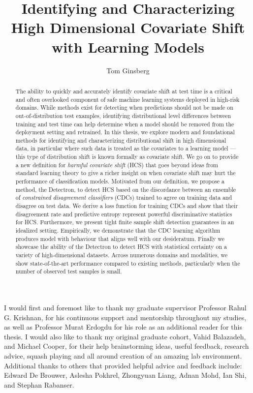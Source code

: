 \documentclass{ut-thesis}
\author{Tom Ginsberg}
\title{Identifying and Characterizing High Dimensional Covariate Shift with Learning Models}
\begin{document}
    \maketitle
    \begin{abstract}
        The ability to quickly and accurately identify covariate shift at test time is a critical and often overlooked component of safe machine learning systems deployed in high-risk domains.
        While methods exist for detecting when predictions should not be made on out-of-distribution test examples, identifying distributional level differences between training and test time can help determine when a model should be removed from the deployment setting and retrained.
        In this thesis, we explore modern and foundational methods for identifying and characterizing distributional shift in high dimensional data, in particular where such data is treated as the covariates to a learning model --- this type of distribution shift is known formally as covariate shift.
        We go on to provide a new definition for \textit{harmful covariate shift} ({\small HCS}) that goes beyond ideas from standard learning theory to give a richer insight on when covariate shift may hurt the performance of classification models.
        Motivated from our definition, we propose a method, the Detectron, to detect {\small HCS} based on the discordance between an ensemble of \textit{constrained disagreement classifiers} (CDCs)  trained to agree on training data and disagree on test data.
        We derive a loss function for training CDCs and show that their disagreement rate and predictive entropy represent powerful discriminative statistics for {\small HCS}.
        Furthermore, we present tight finite sample shift detection guarantees in an idealized setting.
        Empirically, we demonstrate that the CDC learning algorithm produces model with behaviour that aligns well with our desideratum.
        Finally we showcase the ability of the Detectron to detect {\small HCS} with statistical certainty on a variety of high-dimensional datasets.
        Across numerous domains and modalities, we show state-of-the-art performance compared to existing methods, particularly when the number of observed test samples is small.
    \end{abstract}

    \begin{acknowledgements}
        I would first and foremost like to thank my graduate supervisor Professor Rahul G. Krishnan,
        for his continuous support and mentorship throughout my studies, as well as Professor Murat Erdogdu for
        his role as an additional reader for this thesis.
        I would also like to thank my original graduate cohort, Vahid Balazadeh, and Michael Cooper, for their
        help brainstorming ideas, useful feedback, research advice, squash playing and all
        around creation of an amazing lab environment.
        Additional thanks to others that provided helpful advice and feedback include:
        Edward De Brouwer, Aslesha Pokhrel, Zhongyuan Liang, Adnan Mohd, Ian Shi, and Stephan Rabanser.
    \end{acknowledgements}
    \tableofcontents
    \listoftables
    \listoffigures
\end{document}
